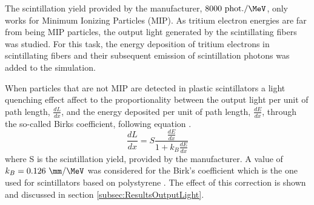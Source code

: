 The scintillation yield provided by the manufacturer, $8000~\text{phot.}/\MeV$, only works for Minimum Ionizing Particles (MIP). As tritium electron energies are far from being MIP particles, the output light generated by the scintillating fibers was studied. For this task, the energy deposition of tritium electrons in scintillating fibers and their subsequent emission of scintillation photons was added to the simulation.

When particles that are not MIP are detected in plastic scintillators a light quenching effect affect to the proportionality between the output light per unit of path length, $\frac{dL}{dx}$, and the energy deposited per unit of path length, $\frac{dE}{dx}$, through the so-called Birks coefficient, following equation \cite{BirksPaper}.
\begin{equation}
\frac{dL}{dx}= S\frac{\displaystyle{\frac{dE}{dx}}}{1+k_B\displaystyle{\frac{dE}{dx}}}
\label{eq:birkscoefficient}
\end{equation}
where S is the scintillation yield, provided by the manufacturer. A value of $k_B=0.126~\mm/\MeV$ was considered for the Birk's coefficient which is the one used for scintillators based on polystyrene \cite{BirksCoefficient}. The effect of this correction is shown and discussed in section \ref{subsec:ResultsOutputLight}.